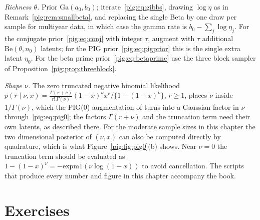 \emph{Richness $\theta$.} Prior $\mathrm{Ga}(a_0,b_0)$; iterate~\eqref{pig:eq:gibbs}, drawing $\log\eta$ as in Remark~\ref{pig:rem:smallbeta}, and replacing the single Beta by one draw per sample for multiyear data, in which case the gamma rate is $b_0-\sum_j\log\eta_j$. For the conjugate prior~\eqref{pig:eq:conj} with integer $\tau$, augment with $\tau$ additional $\mathrm{Be}(\theta,n_0)$ latents; for the PIG prior~\eqref{pig:eq:pigprior} this is the single extra latent $\eta_0$. For the beta prime prior~\eqref{pig:eq:betaprime} use the three block sampler of Proposition~\ref{pig:prop:threeblock}.

\emph{Shape $\nu$.} The zero truncated negative binomial likelihood $p(r\mid\nu,x)=\frac{\Gamma(r+\nu)}{r!\,\Gamma(\nu)}(1-x)^{\nu}x^{r}/\{1-(1-x)^{\nu}\}$, $r\ge1$, places $\nu$ inside $1/\Gamma(\nu)$, which the PIG(0) augmentation of \citet[Section 4.1]{pig:he2022} turns into a Gaussian factor in $\nu$ through~\eqref{pig:eq:pig0}; the factors $\Gamma(r+\nu)$ and the truncation term need their own latents, as described there. For the moderate sample sizes in this chapter the two dimensional posterior of $(\nu,x)$ can also be computed directly by quadrature, which is what Figure~\ref{pig:fig:pig0}(b) shows. Near $\nu=0$ the truncation term should be evaluated as $1-(1-x)^\nu=-\mathrm{expm1}(\nu\log(1-x))$ to avoid cancellation. The scripts that produce every number and figure in this chapter accompany the book.

\section{Exercises}\label{pig:sec:exercises}

